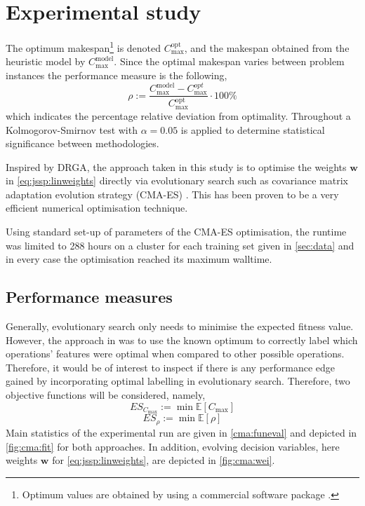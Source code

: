 \documentclass[graybox]{svmult}
\renewcommand{\vec}[1]{\mathbf{#1}}
\newcommand{\Exp}{{\mathbb E}}
\begin{document}
\section{Experimental study}\label{sec:expr}
The optimum makespan\footnote{Optimum values are obtained by using a commercial 
	software package \cite{gurobi}.} is denoted $C_{\max}^{\text{opt}}$, and 
	the 
makespan obtained from the heuristic model by $C_{\max}^{\text{model}}$. Since 
the optimal makespan varies between problem instances the performance measure 
is the following, 
\begin{equation}\label{eq:ratio}
	\rho := \frac{C_{\max}^{\text{model}}-C_{\max}^{opt}}{C_{\max}^{\text{opt}}} 
	\cdot 100\%
\end{equation}
which indicates the percentage relative deviation from optimality. Throughout a 
Kolmogorov-Smirnov test with $\alpha=0.05$ is applied to determine statistical 
significance between methodologies. 

Inspired by DRGA, the approach taken in this study is to optimise the weights 
$\vec{w}$ in \cref{eq:jssp:linweights} directly via evolutionary search such as 
covariance matrix adaptation evolution strategy (CMA-ES) \cite{Hansen01}. This 
has been proven to be a very efficient numerical optimisation technique. 

Using standard set-up of parameters of the CMA-ES optimisation, the runtime was 
limited to 288 hours on a cluster for each training set given in 
\cref{sec:data} and in every case the optimisation reached its maximum walltime.

\subsection{Performance measures}\label{sec:expr:measure}
Generally, evolutionary search only needs to minimise the expected fitness 
value. However, the  approach in \cite{InRu11a} was to use the known optimum to 
correctly label which operations' features were optimal when compared to other 
possible operations. Therefore, it would be of interest to inspect if there is 
any performance edge gained by incorporating optimal labelling in evolutionary 
search. Therefore, two objective functions will be considered, namely, 
\begin{equation}
	ES_{C_{\max}} := \min \Exp[C_{\max}] \label{eq:cma:makespan}
\end{equation}
\begin{equation}
	ES_{\rho} := \min \Exp[\rho] \label{eq:cma:rho}
\end{equation} 
Main statistics of the experimental run are given in \cref{cma:funeval} and 
depicted in \cref{fig:cma:fit} for both approaches. In addition, evolving 
decision variables, here weights $\vec{w}$ for \cref{eq:jssp:linweights}, are 
depicted in \cref{fig:cma:wei}. 
\end{document}

